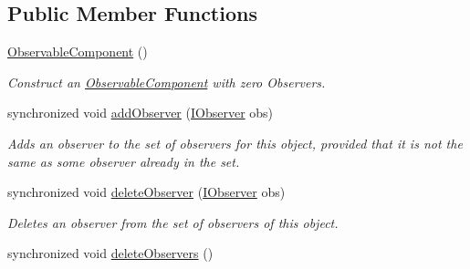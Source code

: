 \subsection*{Public Member Functions}
\begin{DoxyCompactItemize}
\item 
\hypertarget{classuk_1_1ac_1_1dmu_1_1iesd_1_1cascade_1_1util_1_1_observable_component_a17b6018ada7da126667f770424bb8303}{\hyperlink{classuk_1_1ac_1_1dmu_1_1iesd_1_1cascade_1_1util_1_1_observable_component_a17b6018ada7da126667f770424bb8303}{Observable\-Component} ()}\label{classuk_1_1ac_1_1dmu_1_1iesd_1_1cascade_1_1util_1_1_observable_component_a17b6018ada7da126667f770424bb8303}

\begin{DoxyCompactList}\small\item\em Construct an \hyperlink{classuk_1_1ac_1_1dmu_1_1iesd_1_1cascade_1_1util_1_1_observable_component}{Observable\-Component} with zero Observers. \end{DoxyCompactList}\item 
synchronized void \hyperlink{classuk_1_1ac_1_1dmu_1_1iesd_1_1cascade_1_1util_1_1_observable_component_a2de999ded542075a4074e1e3afaf50ba}{add\-Observer} (\hyperlink{interfaceuk_1_1ac_1_1dmu_1_1iesd_1_1cascade_1_1util_1_1_i_observer}{I\-Observer} obs)
\begin{DoxyCompactList}\small\item\em Adds an observer to the set of observers for this object, provided that it is not the same as some observer already in the set. \end{DoxyCompactList}\item 
synchronized void \hyperlink{classuk_1_1ac_1_1dmu_1_1iesd_1_1cascade_1_1util_1_1_observable_component_a456fb504f132e9cac14544ec51db6ad0}{delete\-Observer} (\hyperlink{interfaceuk_1_1ac_1_1dmu_1_1iesd_1_1cascade_1_1util_1_1_i_observer}{I\-Observer} obs)
\begin{DoxyCompactList}\small\item\em Deletes an observer from the set of observers of this object. \end{DoxyCompactList}\item 
\hypertarget{classuk_1_1ac_1_1dmu_1_1iesd_1_1cascade_1_1util_1_1_observable_component_a58117b249843387842a6e6039f32151f}{synchronized void \hyperlink{classuk_1_1ac_1_1dmu_1_1iesd_1_1cascade_1_1util_1_1_observable_component_a58117b249843387842a6e6039f32151f}{delete\-Observers} ()}\label{classuk_1_1ac_1_1dmu_1_1iesd_1_1cascade_1_1util_1_1_observable_component_a58117b249843387842a6e6039f32151f}


\end{DoxyCompactItemize}
